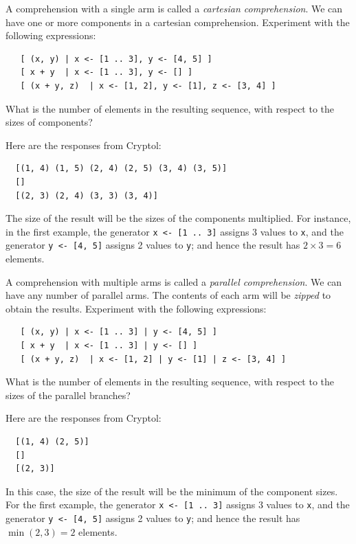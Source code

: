 \begin{Exercise}\label{ex:seq:4}
  A comprehension with a single arm is called a {\em cartesian
    comprehension}. We can have one or more components in a cartesian
  comprehension.  Experiment with the following
  expressions:\indComp\indCartesian
\begin{Verbatim}
   [ (x, y) | x <- [1 .. 3], y <- [4, 5] ]
   [ x + y  | x <- [1 .. 3], y <- [] ]
   [ (x + y, z)  | x <- [1, 2], y <- [1], z <- [3, 4] ]
\end{Verbatim}
What is the number of elements in the resulting sequence, with respect
to the sizes of components?

\end{Exercise}
\begin{Answer}
Here are the responses from Cryptol:
\begin{Verbatim}
  [(1, 4) (1, 5) (2, 4) (2, 5) (3, 4) (3, 5)]
  []
  [(2, 3) (2, 4) (3, 3) (3, 4)]
\end{Verbatim}
The size of the result will be the sizes of the components
multiplied. For instance, in the first example, the generator {\tt x
  <- [1 .. 3]} assigns 3 values to {\tt x}, and the generator {\tt y
  <- [4, 5]} assigns 2 values to {\tt y}; and hence the result has
$2\times 3 = 6$ elements.
\end{Answer}

\begin{Exercise}\label{ex:seq:5}\indParallel\indComp
  A comprehension with multiple arms is called a {\em parallel
    comprehension}.  We can have any number of parallel arms. The
  contents of each arm will be {\em zipped} to obtain the results.
  Experiment with the following expressions:
\begin{Verbatim}
   [ (x, y) | x <- [1 .. 3] | y <- [4, 5] ]
   [ x + y  | x <- [1 .. 3] | y <- [] ]
   [ (x + y, z)  | x <- [1, 2] | y <- [1] | z <- [3, 4] ]
\end{Verbatim}
What is the number of elements in the resulting sequence, with respect
to the sizes of the parallel branches?
\end{Exercise}
\begin{Answer}
Here are the responses from Cryptol:
\begin{Verbatim}
  [(1, 4) (2, 5)]
  []
  [(2, 3)]
\end{Verbatim}
In this case, the size of the result will be the minimum of the
component sizes. For the first example, the generator {\tt x <- [1
  .. 3]} assigns 3 values to {\tt x}, and the generator {\tt y <- [4,
  5]} assigns 2 values to {\tt y}; and hence the result has $\min(2,3)
= 2$ elements.
\end{Answer}

